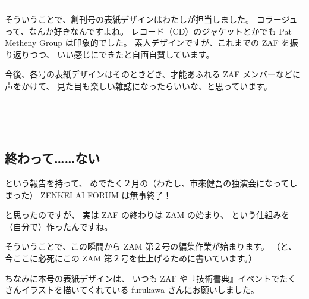 \documentclass[dvipdfmx,autodetect-engine,10pt,b5paper,papersize,openany,dvipsnames]{jsbook}
\begin{document}
\vspace{8cm}

\hrule

\begin{multicols}{2}

そういうことで、創刊号の表紙デザインはわたしが担当しました。
コラージュって、なんか好きなんですよね。
レコード（CD）のジャケットとかでも
Pat Metheny Group は印象的でした。
素人デザインですが、これまでの ZAF を振り返りつつ、
いい感じにできたと自画自賛しています。

今後、各号の表紙デザインはそのときどき、才能あふれる ZAF メンバーなどに声をかけて、
見た目も楽しい雑誌になったらいいな、と思っています。


\end{multicols}


\vspace{6cm}


\newpage

\begin{multicols}{2}

\section{終わって……ない}
という報告を持って、
めでたく２月の（わたし、市來健吾の独演会になってしまった）
ZENKEI AI FORUM は無事終了！

と思ったのですが、
実は ZAF の終わりは ZAM の始まり、
という仕組みを（自分で）作ったんですね。

そういうことで、この瞬間から ZAM 第２号の編集作業が始まります。
（と、今ここに必死にこの ZAM 第２号を仕上げるために書いています。）

ちなみに本号の表紙デザインは、
いつも ZAF や『技術書典』イベントでたくさんイラストを描いてくれている
furukawa さんにお願いしました。

\end{multicols}
\end{document}
